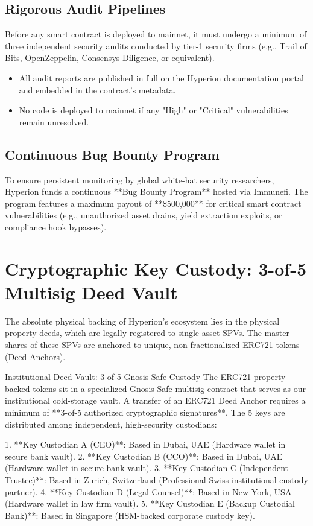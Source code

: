 \documentclass[11pt]{article}
\begin{document}
\subsection{Rigorous Audit Pipelines}
Before any smart contract is deployed to mainnet, it must undergo a minimum of three independent security audits conducted by tier-1 security firms (e.g., Trail of Bits, OpenZeppelin, Consensys Diligence, or equivalent). 
\begin{itemize}
    \item All audit reports are published in full on the Hyperion documentation portal and embedded in the contract's metadata.
    \item No code is deployed to mainnet if any "High" or "Critical" vulnerabilities remain unresolved.
\end{itemize}

\subsection{Continuous Bug Bounty Program}
To ensure persistent monitoring by global white-hat security researchers, Hyperion funds a continuous **Bug Bounty Program** hosted via Immunefi. The program features a maximum payout of **\$500,000** for critical smart contract vulnerabilities (e.g., unauthorized asset drains, yield extraction exploits, or compliance hook bypasses).

\section{Cryptographic Key Custody: 3-of-5 Multisig Deed Vault}
The absolute physical backing of Hyperion's ecosystem lies in the physical property deeds, which are legally registered to single-asset SPVs. The master shares of these SPVs are anchored to unique, non-fractionalized ERC721 tokens (Deed Anchors). 

\begin{regulatorybox}{Institutional Deed Vault: 3-of-5 Gnosis Safe Custody}
The ERC721 property-backed tokens sit in a specialized Gnosis Safe multisig contract that serves as our institutional cold-storage vault. A transfer of an ERC721 Deed Anchor requires a minimum of **3-of-5 authorized cryptographic signatures**. The 5 keys are distributed among independent, high-security custodians:

1. **Key Custodian A (CEO)**: Based in Dubai, UAE (Hardware wallet in secure bank vault).
2. **Key Custodian B (CCO)**: Based in Dubai, UAE (Hardware wallet in secure bank vault).
3. **Key Custodian C (Independent Trustee)**: Based in Zurich, Switzerland (Professional Swiss institutional custody partner).
4. **Key Custodian D (Legal Counsel)**: Based in New York, USA (Hardware wallet in law firm vault).
5. **Key Custodian E (Backup Custodial Bank)**: Based in Singapore (HSM-backed corporate custody key).
\end{regulatorybox}
\end{document}
